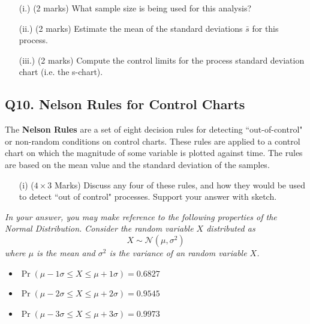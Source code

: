 \documentclass[a4paper,12pt]{article}
\begin{document}
\begin{itemize}
	\item[(i.)] (2 marks) What sample size is being used for this analysis?
	\item[(ii.)](2 marks) Estimate the mean of the standard deviations $\bar{s}$ for this process.
	\item[(iii.)] (2 marks) Compute the control limits for the process standard deviation chart (i.e. the s-chart).
\end{itemize}
\subsection*{Q10. Nelson Rules for Control Charts}
The \textbf{Nelson Rules} are a set of eight decision rules for detecting ``out-of-control" or non-random conditions on control charts. These rules are applied to a control chart on which the magnitude of some variable is plotted against time. The rules are based on the mean value and the standard deviation of the samples.\\

\begin{itemize}
	\item[(i)] ($4 \times 3$ Marks) Discuss any four of these rules, and how they would be used to detect ``out of control" processes. Support your answer with sketch.
\end{itemize}

\bigskip 
\begin{framed}
	\noindent \textit{In your answer, you may make reference to the following properties of the Normal Distribution. Consider the random variable $X$ distributed as
		\[X \sim \mathcal{N}(\mu,\sigma^2)\]
		where $\mu$ is the mean and $\sigma^2$ is the variance of an random variable $X$.}
	\begin{itemize}
		\item $\Pr( \mu - 1\sigma \leq X \leq \mu + 1\sigma ) = 0.6827$
		\item $\Pr( \mu - 2\sigma \leq X \leq \mu + 2\sigma ) = 0.9545$
		\item $\Pr( \mu - 3\sigma \leq X \leq \mu + 3\sigma )= 0.9973$
		
	\end{itemize}
\end{framed}
\end{document}
